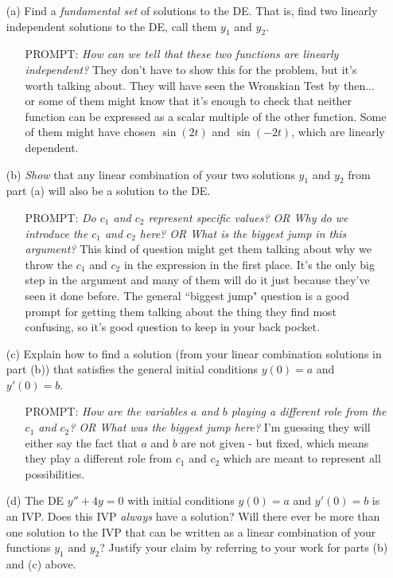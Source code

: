 \documentclass[epsf]{article}
\begin{document}
\begin{itemize}
\item[(a)] Find a \textit{fundamental set} of solutions to the DE.  That is, find two linearly independent solutions to the DE, call them $y_1$ and $y_2$.

\begin{itemize}
\item[PROMPT:]\textit{How can we tell that these two functions are linearly independent?}  They don't have to show this for the problem, but it's worth talking about.  They will have seen the Wronskian Test by then... or some of them might know that it's enough to check that neither function can be expressed as a scalar multiple of the other function.  Some of them might have chosen $\sin(2t)$ and $\sin(-2t)$, which are linearly dependent.  
\end{itemize}

\item[(b)] \textit{Show} that any linear combination of your two solutions $y_1$ and $y_2$ from part (a) will also be a solution to the DE.

\begin{itemize}
\item[PROMPT:]\textit{Do $c_1$ and $c_2$ represent specific values? OR Why do we introduce the $c_1$ and $c_2$ here?  OR What is the biggest jump in this argument?}  This kind of question might get them talking about why we throw the $c_1$ and $c_2$ in the expression in the first place.  It's the only big step in the argument and many of them will do it just because they've seen it done before.  The general ``biggest jump" question is a good prompt for getting them talking about the thing they find most confusing, so it's good question to keep in your back pocket.   
\end{itemize}

\item[(c)] Explain how to find a solution (from your linear combination solutions in part (b)) that satisfies the general initial conditions $y(0)=a$ and $y'(0)=b$. 

\begin{itemize}
\item[PROMPT:]\textit{How are the variables $a$ and $b$ playing a different role from the $c_1$ and $c_2$?  OR What was the biggest jump here?}  I'm guessing they will either say the fact that $a$ and $b$ are not given - but fixed, which means they play a different role from $c_1$ and $c_2$ which are meant to represent all possibilities.  
\end{itemize}

\item[(d)] The DE $y'' + 4y = 0$ with initial conditions $y(0)=a$ and $y'(0)=b$ is an IVP.  Does this IVP \textit{always} have a solution?  Will there ever be more than one solution to the IVP that can be written as a linear combination of your functions $y_1$ and $y_2$?  Justify your claim by referring to your work for parts (b) and (c) above.
\end{itemize}
\end{document}
